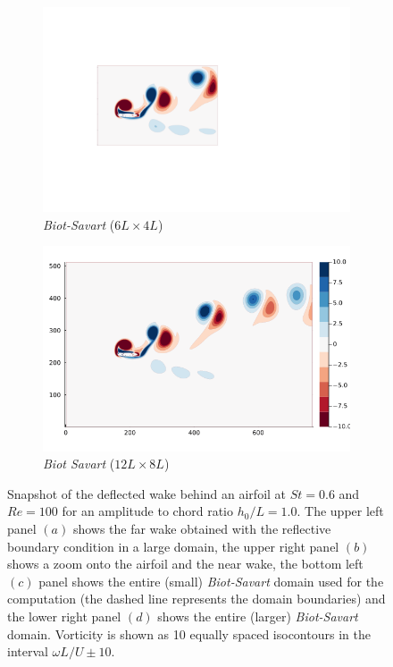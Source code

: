\documentclass{article}
\begin{document}
\begin{figure}
\begin{subfigure}{.48\textwidth}
        \includegraphics[trim={2.8cm 2cm 4cm 2cm},clip,width=\textwidth]{tex//fig/Deflected_wake_snap_BS.png}
        \caption{\emph{Biot-Savart} ($6L\times4L$)}
    \end{subfigure}%
    \hspace{0.1cm}
    \begin{subfigure}{.48\textwidth}
        \centering
        \includegraphics[trim={2.8cm 2cm 4cm 2cm},clip,width=\textwidth]{tex//fig/Deflected_wake_snap_BS_2x.png}
        \caption{\emph{Biot Savart} ($12L\times8L$)}
    \end{subfigure}
    \caption{Snapshot of the deflected wake behind an airfoil at $St=0.6$ and $Re=100$ for an amplitude to chord ratio $h_0/L=1.0$. The upper left panel $(a)$ shows the far wake obtained with the reflective boundary condition in a large domain, the upper right panel $(b)$ shows a zoom onto the airfoil and the near wake, the bottom left $(c)$ panel shows the entire (small) \emph{Biot-Savart} domain used for the computation (the dashed line represents the domain boundaries) and the lower right panel $(d)$ shows the entire (larger) \emph{Biot-Savart} domain. Vorticity is shown as 10 equally spaced isocontours in the interval $\omega L/U \pm 10$.}
    \label{fig:deflected_wake}
\end{figure}
\end{document}
